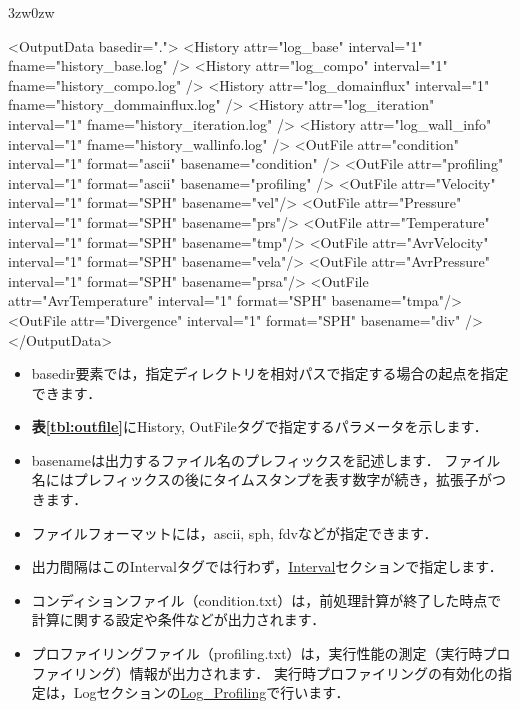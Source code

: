 \begin{indentation}{3zw}{0zw}

{\small
\begin{program}
<OutputData basedir=".">
  <History attr="log_base"       interval="1" fname="history_base.log" />
  <History attr="log_compo"      interval="1" fname="history_compo.log" />
  <History attr="log_domainflux" interval="1" fname="history_dommainflux.log" />
  <History attr="log_iteration"  interval="1" fname="history_iteration.log" />
  <History attr="log_wall_info"  interval="1" fname="history_wallinfo.log" />
  <OutFile attr="condition"      interval="1" format="ascii" basename="condition" />
  <OutFile attr="profiling"      interval="1" format="ascii" basename="profiling" />
  <OutFile attr="Velocity"       interval="1" format="SPH"   basename="vel"/>
  <OutFile attr="Pressure"       interval="1" format="SPH"   basename="prs"/>
  <OutFile attr="Temperature"    interval="1" format="SPH"   basename="tmp"/>
  <OutFile attr="AvrVelocity"    interval="1" format="SPH"   basename="vela"/>
  <OutFile attr="AvrPressure"    interval="1" format="SPH"   basename="prsa"/>
  <OutFile attr="AvrTemperature" interval="1" format="SPH"   basename="tmpa"/>
  <OutFile attr="Divergence"     interval="1" format="SPH"   basename="div" />
</OutputData>
\end{program}
}

\begin{itemize}
\item basedir要素では，指定ディレクトリを相対パスで指定する場合の起点を指定できます．
\item \textbf{表\ref{tbl:outfile}}にHistory, OutFileタグで指定するパラメータを示します．
\item basenameは出力するファイル名のプレフィックスを記述します．
ファイル名にはプレフィックスの後にタイムスタンプを表す数字が続き，拡張子がつきます．
\item ファイルフォーマットには，ascii, sph, fdvなどが指定できます．
\item 出力間隔はこのIntervalタグでは行わず，\hyperlink{tgt:interval}{Interval}セクションで指定します．
\item コンディションファイル（condition.txt）は，前処理計算が終了した時点で計算に関する設定や条件などが出力されます．
\item プロファイリングファイル（profiling.txt）は，実行性能の測定（実行時プロファイリング）情報が出力されます．
実行時プロファイリングの有効化の指定は，Logセクションの\hyperlink{tgt:log}{Log\_Profiling}で行います．
\end{itemize}



\end{indentation}
